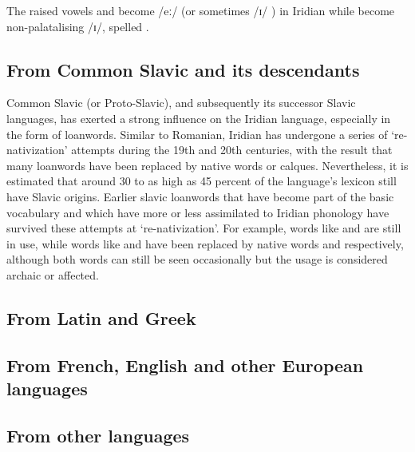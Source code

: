 The raised vowels  and  become /eː/  (or sometimes /ɪ/
) in Iridian while  become non-palatalising /ɪ/, spelled
.


\subsection{From Common Slavic and its descendants}

Common Slavic (or Proto-Slavic), and subsequently its successor Slavic
languages, has exerted a strong influence on the Iridian language, especially in
the form of loanwords. Similar to Romanian, Iridian has undergone a series of
`re-nativization' attempts during the 19th and 20th centuries, with the result
that many loanwords have been replaced by native words or calques. Nevertheless,
it is estimated that around 30 to as high as 45 percent of the language's
lexicon still have Slavic origins. Earlier slavic loanwords that have become
part of the basic vocabulary and which have more or less assimilated to Iridian
phonology have survived these attempts at `re-nativization'. For example, words
like  and  are still in use, while words
like  and  have been replaced by native
words  and  respectively, although both words can still
be seen occasionally but the usage is considered archaic or affected.



\subsection{From Latin and Greek}

\subsection{From French, English and other European languages}

\subsection{From other languages}